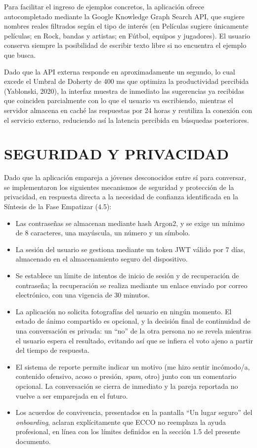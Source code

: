 Para facilitar el ingreso de ejemplos concretos, la aplicación ofrece autocompletado mediante la Google Knowledge Graph Search API, que sugiere nombres reales filtrados según el tipo de interés (en Películas sugiere únicamente películas; en Rock, bandas y artistas; en Fútbol, equipos y jugadores). El usuario conserva siempre la posibilidad de escribir texto libre si no encuentra el ejemplo que busca.

Dado que la API externa responde en aproximadamente un segundo, lo cual excede el Umbral de Doherty de 400 ms que optimiza la productividad percibida (Yablonski, 2020), la interfaz muestra de inmediato las sugerencias ya recibidas que coinciden parcialmente con lo que el usuario va escribiendo, mientras el servidor almacena en caché las respuestas por 24 horas y reutiliza la conexión con el servicio externo, reduciendo así la latencia percibida en búsquedas posteriores.


\section{SEGURIDAD Y PRIVACIDAD}
Dado que la aplicación empareja a jóvenes desconocidos entre sí para conversar, se implementaron los siguientes mecanismos de seguridad y protección de la privacidad, en respuesta directa a la necesidad de confianza identificada en la Síntesis de la Fase Empatizar (4.5):

\begin{itemize}
    \item Las contraseñas se almacenan mediante hash Argon2, y se exige un mínimo de 8 caracteres, una mayúscula, un número y un símbolo.
    \item La sesión del usuario se gestiona mediante un token JWT válido por 7 días, almacenado en el almacenamiento seguro del dispositivo.
    \item Se establece un límite de intentos de inicio de sesión y de recuperación de contraseña; la recuperación se realiza mediante un enlace enviado por correo electrónico, con una vigencia de 30 minutos.
    \item La aplicación no solicita fotografías del usuario en ningún momento. El estado de ánimo compartido es opcional, y la decisión final de continuidad de una conversación es privada: un ``no'' de la otra persona no se revela mientras el usuario espera el resultado, evitando así que se infiera el voto ajeno a partir del tiempo de respuesta.
    \item El sistema de reporte permite indicar un motivo (me hizo sentir incómodo/a, contenido ofensivo, acoso o presión, \textit{spam}, otro) junto con un comentario opcional. La conversación se cierra de inmediato y la pareja reportada no vuelve a ser emparejada en el futuro.
    \item Los acuerdos de convivencia, presentados en la pantalla ``Un lugar seguro'' del \textit{onboarding}, aclaran explícitamente que ECCO no reemplaza la ayuda profesional, en línea con los límites definidos en la sección 1.5 del presente documento.
\end{itemize}

